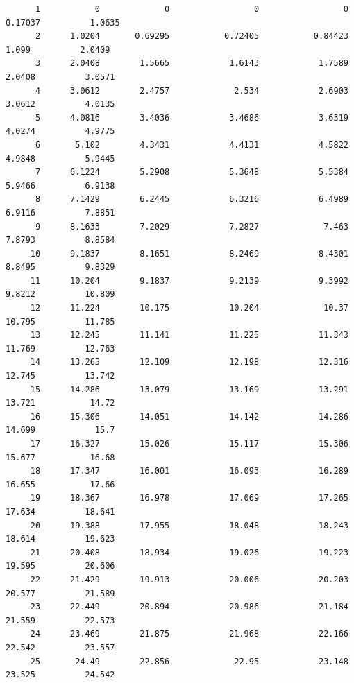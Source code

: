 \documentclass[
]{book}
\begin{document}
\begin{verbatim}
      1           0             0                 0                 0           0.17037          1.0635    
      2      1.0204       0.69295           0.72405           0.84423             1.099          2.0409    
      3      2.0408        1.5665            1.6143            1.7589            2.0408          3.0571    
      4      3.0612        2.4757             2.534            2.6903            3.0612          4.0135    
      5      4.0816        3.4036            3.4686            3.6319            4.0274          4.9775    
      6       5.102        4.3431            4.4131            4.5822            4.9848          5.9445    
      7      6.1224        5.2908            5.3648            5.5384            5.9466          6.9138    
      8      7.1429        6.2445            6.3216            6.4989            6.9116          7.8851    
      9      8.1633        7.2029            7.2827             7.463            7.8793          8.8584    
     10      9.1837        8.1651            8.2469            8.4301            8.8495          9.8329    
     11      10.204        9.1837            9.2139            9.3992            9.8212          10.809    
     12      11.224        10.175            10.204             10.37            10.795          11.785    
     13      12.245        11.141            11.225            11.343            11.769          12.763    
     14      13.265        12.109            12.198            12.316            12.745          13.742    
     15      14.286        13.079            13.169            13.291            13.721           14.72    
     16      15.306        14.051            14.142            14.286            14.699            15.7    
     17      16.327        15.026            15.117            15.306            15.677           16.68    
     18      17.347        16.001            16.093            16.289            16.655           17.66    
     19      18.367        16.978            17.069            17.265            17.634          18.641    
     20      19.388        17.955            18.048            18.243            18.614          19.623    
     21      20.408        18.934            19.026            19.223            19.595          20.606    
     22      21.429        19.913            20.006            20.203            20.577          21.589    
     23      22.449        20.894            20.986            21.184            21.559          22.573    
     24      23.469        21.875            21.968            22.166            22.542          23.557    
     25       24.49        22.856             22.95            23.148            23.525          24.542    

\end{verbatim}
\end{document}
